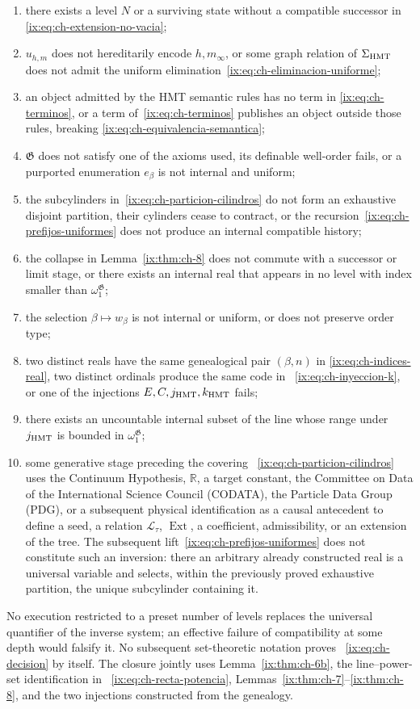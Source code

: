 \begin{enumerate}
\item there exists a level \(N\) or a surviving state without a compatible successor in
\eqref{ix:eq:ch-extension-no-vacia};
\item \(u_{h,m}\) does not hereditarily encode \(h,m_\infty\), or some graph
relation of \(\Sigma_{\rm HMT}\) does not admit the uniform elimination~\eqref{ix:eq:ch-eliminacion-uniforme};
\item an object admitted by the HMT semantic rules has no term in
\eqref{ix:eq:ch-terminos}, or a term of~\eqref{ix:eq:ch-terminos} publishes an object outside those rules, breaking
\eqref{ix:eq:ch-equivalencia-semantica};
\item \(\mathfrak G\) does not satisfy one of the axioms used, its definable
well-order fails, or a purported enumeration \(e_\beta\) is not internal and
uniform;
\item the subcylinders in~\eqref{ix:eq:ch-particion-cilindros} do not form an
exhaustive disjoint partition, their cylinders cease to contract, or the
recursion~\eqref{ix:eq:ch-prefijos-uniformes} does not produce an internal
compatible history;
\item the collapse in Lemma~\ref{ix:thm:ch-8} does not commute with a successor or
limit stage, or there exists an internal real that appears in no level with
index smaller than
\(\omega_1^{\mathfrak G}\);
\item the selection \(\beta\mapsto w_\beta\) is not internal or uniform, or
does not preserve order type;
\item two distinct reals have the same genealogical pair \((\beta,n)\) in
\eqref{ix:eq:ch-indices-real}, two distinct ordinals produce the same code in
~\eqref{ix:eq:ch-inyeccion-k}, or one of the injections
\(E,C,j_{\rm HMT},k_{\rm HMT}\) fails;
\item there exists an uncountable internal subset of the line whose range under
\(j_{\rm HMT}\) is bounded in \(\omega_1^{\mathfrak G}\);
\item some generative stage preceding the covering
~\eqref{ix:eq:ch-particion-cilindros} uses the Continuum Hypothesis,
\(\mathbb R\), a target constant, the Committee on Data of the International
Science Council (CODATA), the Particle Data Group (PDG), or a subsequent
physical identification as a causal antecedent to define a seed, a relation
\(\mathscr L_\tau\), \(\operatorname{Ext}\), a coefficient, admissibility, or
an extension of the tree. The subsequent lift~\eqref{ix:eq:ch-prefijos-uniformes}
does not constitute such an inversion: there an arbitrary already constructed
real is a universal variable and selects, within the previously proved
exhaustive partition, the unique subcylinder containing it.
\end{enumerate}

No execution restricted to a preset number of levels replaces the universal
quantifier of the inverse system; an effective failure of compatibility at
some depth would falsify it. No subsequent set-theoretic notation proves
~\eqref{ix:eq:ch-decision} by itself. The closure jointly uses
Lemma~\ref{ix:thm:ch-6b}, the line--power-set identification in
~\eqref{ix:eq:ch-recta-potencia}, Lemmas~\ref{ix:thm:ch-7}--\ref{ix:thm:ch-8}, and the
two injections constructed from the genealogy.
